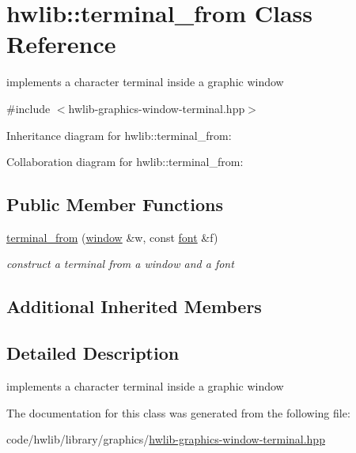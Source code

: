 \hypertarget{classhwlib_1_1terminal__from}{}\section{hwlib\+:\+:terminal\+\_\+from Class Reference}
\label{classhwlib_1_1terminal__from}


implements a character terminal inside a graphic window  




{\ttfamily \#include $<$hwlib-\/graphics-\/window-\/terminal.\+hpp$>$}



Inheritance diagram for hwlib\+:\+:terminal\+\_\+from\+:


Collaboration diagram for hwlib\+:\+:terminal\+\_\+from\+:
\subsection*{Public Member Functions}
\begin{DoxyCompactItemize}
\item 
\mbox{\label{classhwlib_1_1terminal__from_a400a133dec12c0617db38c94ca75ba79}} 
\hyperlink{classhwlib_1_1terminal__from_a400a133dec12c0617db38c94ca75ba79}{terminal\+\_\+from} (\hyperlink{classhwlib_1_1window}{window} \&w, const \hyperlink{classhwlib_1_1font}{font} \&f)
\begin{DoxyCompactList}\small\item\em construct a terminal from a window and a font \end{DoxyCompactList}\end{DoxyCompactItemize}
\subsection*{Additional Inherited Members}


\subsection{Detailed Description}
implements a character terminal inside a graphic window 

The documentation for this class was generated from the following file\+:\begin{DoxyCompactItemize}
\item 
code/hwlib/library/graphics/\hyperlink{hwlib-graphics-window-terminal_8hpp}{hwlib-\/graphics-\/window-\/terminal.\+hpp}\end{DoxyCompactItemize}
